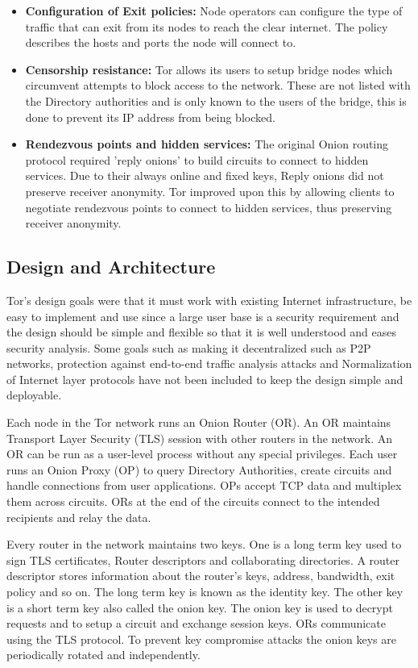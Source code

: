\documentclass{llncs}
\begin{document}
\begin{itemize}
	\item[]{\textbf{Configuration of Exit policies:} Node operators can configure the type of traffic that can exit from its nodes to reach the clear internet. The policy describes the hosts and ports the node will connect to.}
	\item[]{\textbf{Censorship resistance:} Tor allows its users to setup bridge nodes which circumvent attempts to block access to the network. These are not listed with the Directory authorities and is only known to the users of the bridge, this is done to prevent its IP address from being blocked.}
		\item[]{\textbf{Rendezvous points and hidden services:} The original Onion routing protocol required 'reply onions' to build circuits to connect to hidden services. Due to their always online and fixed keys, Reply onions did not preserve receiver anonymity. Tor improved upon this by allowing clients to negotiate rendezvous points to connect to hidden services, thus preserving receiver anonymity.}
\end{itemize}

\subsection{Design and Architecture}
Tor's design goals were that it must work with existing Internet infrastructure, be easy to implement and use since a large user base is a security requirement and the design should be simple and flexible so that it is well understood and eases security analysis. Some goals such as making it decentralized such as P2P networks, protection against end-to-end traffic analysis attacks and Normalization of Internet layer protocols have not been included to keep the design simple and deployable.

Each node in the Tor network runs an Onion Router (OR). An OR maintains Transport Layer Security (TLS) session with other routers in the network. An OR can be run as a user-level process without any special privileges. Each user runs an Onion Proxy (OP) to query Directory Authorities, create circuits and handle connections from user applications. OPs accept TCP data and multiplex them across circuits. ORs at the end of the circuits connect to the intended recipients and relay the data.

Every router in the network maintains two keys. One is a long term key used to sign TLS certificates, Router descriptors and collaborating directories. A router descriptor stores information about the router's keys, address, bandwidth, exit policy and so on. The long term key is known as the identity key. The other key is a short term key also called the onion key. The onion key is used to decrypt requests and to setup a circuit and exchange session keys. ORs communicate using the TLS protocol. To prevent key compromise attacks the onion keys are periodically rotated and independently.
\end{document}

